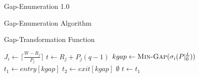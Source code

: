 \documentclass{beamer}
\begin{document}
\begin{section}{Gap-Enumeration 1.0}
\begin{frame}{Gap-Enumeration Algorithm\autocite[11]{BelwalCheng}}
  \begin{algorithm}[H]
    {\tiny
      \begin{algorithmic}[1]
            \State{$\sigma_{n}(P|_{0}^{L}) \gets \{[0,L)\}$}
              \EndIf
            \EndFor
            \State{$[t_{1},t_{2}) \gets \Call{Gap-Search}{\sigma_{j}(P|_{0}^{L}), C_{j}}$}
            \EndIf
            \EndIf
          \EndWhile
      \EndFunction
      \end{algorithmic}
    }
  \end{algorithm}
\end{frame}
\begin{frame}{Gap-Transformation Function\autocite[12]{BelwalCheng}}
  \begin{algorithm}[H]
  \begin{multicols}{2}
    {\tiny
      \begin{algorithmic}[2]
          \State $J_{i} \gets \lceil\frac{W - R_{j}}{P_{j}}\rceil$
            \State $t \gets R_{j} + P_{j}(q-1)$
            \State $kgap \gets \Call{Min-Gap}{\sigma_{i}(P|_{0}^{L})}$
            \State $t_{1} \gets entry[kgap]$
            \State $t_{2} \gets exit[kgap]$
                \State \Return $\emptyset$
              \EndIf
                \State $t \gets t_{1}$
              \EndIf
                \State \Call{Gap-Delete}{$\sigma_{i}(P|_{0}^{L}), [t_{1},t_{2})$}

\end{algorithmic}}
\end{multicols}
\end{algorithm}
\end{frame}
\end{section}
\end{document}
